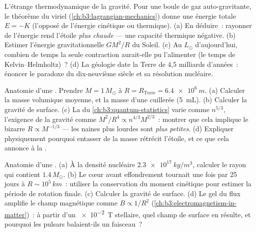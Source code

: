 \begin{exercise}[$\star\star$]\label{exo:b3:astrophysics:5}
L'étrange thermodynamique de la gravité. Pour une boule de gaz
auto-gravitante, le théorème du viriel
(\cref{ch:b3:lagrangian-mechanics}) donne une énergie totale
$E = -K$ (l'opposé de l'énergie cinétique ou thermique).
(a) En déduire~: rayonner de l'énergie rend l'étoile \emph{plus
chaude} --- une capacité thermique négative. (b) Estimer l'énergie
gravitationnelle $GM^2/R$ du Soleil. (c) Au $L_\odot$ d'aujourd'hui,
combien de temps la seule contraction aurait-elle pu l'alimenter (le
temps de Kelvin--Helmholtz)~? (d) La géologie date la Terre de
4,5 milliards d'années~: énoncer le paradoxe du dix-neuvième siècle
et sa résolution nucléaire.
\end{exercise}

\begin{exercise}[$\star\star$]\label{exo:b3:astrophysics:6}
Anatomie d'une . Prendre $M = 1\,M_\odot$ à
$R = R_{\text{Terre}} = \qty{6.4e6}{m}$. (a) Calculer la masse
volumique moyenne, et la masse d'une cuillerée (\qty{5}{mL}). (b)
Calculer la gravité de surface. (c) La  du
\cref{ch:b3:quantum-statistics} varie comme $n^{5/3}$, l'exigence de
la gravité comme $M^2/R^4 \propto n^{4/3}M^{2/3}$~: montrer que cela
implique le bizarre $R \propto M^{-1/3}$ --- les naines plus lourdes
sont \emph{plus petites}. (d) Expliquer physiquement pourquoi
entasser de la masse rétrécit l'étoile, et ce que cela annonce à la
.
\end{exercise}

\begin{exercise}[$\star\star$]\label{exo:b3:astrophysics:7}
Anatomie d'une . (a) À la densité nucléaire
$\qty{2.3e17}{kg/m^3}$, calculer le rayon qui contient
$1.4\,M_\odot$. (b) Le cœur avant effondrement tournait une fois par
25 jours à $R \sim 10^5\,\unit{km}$~: utiliser la conservation du
moment cinétique pour estimer la période de rotation finale. (c)
Calculer la gravité de surface. (d) Le gel du flux amplifie le champ
magnétique comme $B \propto 1/R^2$
(\cref{ch:b3:electromagnetism-in-matter})~: à partir d'un
\qty{e-2}{T} stellaire, quel champ de surface en résulte, et pourquoi
les pulsars balaient-ils un faisceau~?
\end{exercise}

